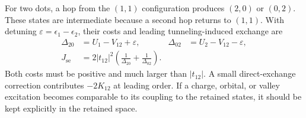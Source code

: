 For two dots, a hop from the $(1,1)$ configuration produces
$(2,0)$ or $(0,2)$. These states are intermediate because
a second hop returns to $(1,1)$.
With detuning $\varepsilon=\epsilon_1-\epsilon_2$, their costs
and leading tunneling-induced exchange are
\begin{equation}
 \begin{aligned}
 \Delta_{20}&=U_1-V_{12}+\varepsilon,
 &\Delta_{02}&=U_2-V_{12}-\varepsilon,\\
 J_{\mathrm{se}}&=2|t_{12}|^2
       \left(\frac1{\Delta_{20}}+\frac1{\Delta_{02}}\right).
 \end{aligned}
 \label{eq:device-general-superexchange}
\end{equation}
Both costs must be positive and much larger than $|t_{12}|$.
A small direct-exchange correction contributes $-2K_{12}$ at
leading order. If a charge, orbital, or valley excitation becomes
comparable to its coupling to the retained states, it should be
kept explicitly in the retained space.

